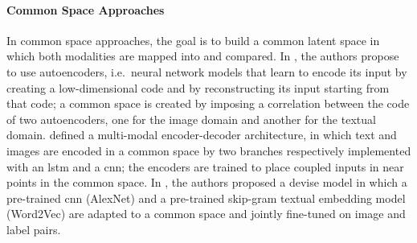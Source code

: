 \paragraph{Common Space Approaches}
In common space approaches, the goal is to build a common latent space in which both modalities are mapped into and compared.
In \cite{ngiam2011multimodal,feng2014cross}, the authors propose to use autoencoders, i.e.\ neural network models that learn to encode its input by creating a low-dimensional code and by reconstructing its input starting from that code;
a common space is created by imposing a correlation between the code of two autoencoders, one for the image domain and another for the textual domain.
\citet{kiros2014unifying} defined a multi-modal encoder-decoder architecture, in which text and images are encoded in a common space by two branches respectively implemented with an \gls{lstm} and a \gls{cnn};
the encoders are trained to place coupled inputs in near points in the common space.
%
In \cite{frome2013devise}, the authors proposed a \gls{devise} model in which a pre-trained \gls{cnn} (AlexNet) and a pre-trained skip-gram textual embedding model (Word2Vec) are adapted to a common space and jointly fine-tuned on image and label pairs.


